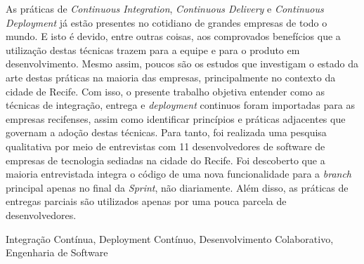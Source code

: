 \resumo

As práticas de \emph{Continuous Integration}, \emph{Continuous Delivery} e \emph{Continuous Deployment} já estão presentes no cotidiano de grandes empresas de todo o mundo. E isto é devido, entre outras coisas, aos comprovados benefícios que a utilização destas técnicas trazem para a equipe e para o produto em desenvolvimento. Mesmo assim, poucos são os estudos que investigam o estado da arte destas práticas na maioria das empresas, principalmente no contexto da cidade de Recife.  Com isso, o presente trabalho objetiva entender como as técnicas de integração, entrega e \emph{deployment} continuos foram importadas para as empresas recifenses, assim como identificar princípios e práticas adjacentes que governam a adoção destas técnicas. Para tanto, foi realizada uma pesquisa qualitativa por meio de entrevistas com 11 desenvolvedores de software de empresas de tecnologia sediadas na cidade do Recife. Foi descoberto que a maioria entrevistada integra o código de uma nova funcionalidade para a \emph{branch} principal apenas no final da \emph{Sprint}, não diariamente. Além disso, as práticas de entregas parciais são utilizados apenas por uma pouca parcela de desenvolvedores.

\begin{keywords}
    Integração Contínua, Deployment Contínuo, Desenvolvimento Colaborativo, Engenharia de Software
\end{keywords}
